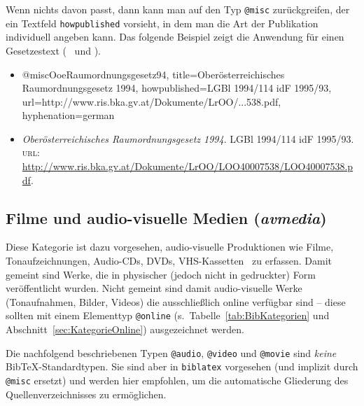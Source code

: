 Wenn nichts davon passt, dann kann man auf den Typ \texttt{@misc} zurückgreifen, der ein
Textfeld \texttt{howpublished} vorsieht, in dem man die Art der Publikation individuell 
angeben kann. Das folgende Beispiel zeigt die Anwendung für einen Gesetzestext 
(\sa\ \cite{FhStG93} und \cite{EuRichtlinie2000}).
%
\begin{itemize}
\item[]
\begin{GenericCode}[numbers=none]
@misc{OoeRaumordnungsgesetz94,
	title={Oberösterreichisches Raumordnungsgesetz 1994},
	howpublished={LGBl 1994/114 idF 1995/93},
	url={http://www.ris.bka.gv.at/Dokumente/LrOO/...538.pdf},
	hyphenation={german}
}
\end{GenericCode}
\item[\cite{OoeRaumordnungsgesetz94}]
\textit{Oberösterreichisches Raumordnungsgesetz 1994}. LGBl 1994/114 idF
1995/93. \textsc{url}: \url{http://www.ris.bka.gv.at/Dokumente/LrOO/LOO40007538/LOO40007538.pdf}.
\end{itemize}
%



\subsection{Filme und audio-visuelle Medien (\emph{avmedia})}
\label{sec:KategorieAvmedia}

Diese Kategorie ist dazu vorgesehen, audio-visuelle Produktionen wie Filme, 
Tonaufzeichnungen, Audio-CDs, DVDs, VHS-Kassetten \usw\ zu erfassen.
Damit gemeint sind Werke, die in physischer (jedoch nicht in gedruckter) Form
veröffentlicht wurden.
Nicht gemeint sind damit audio-visuelle Werke (Tonaufnahmen, Bilder, Videos) 
die ausschließlich online verfügbar sind -- diese sollten mit einem Elementtyp 
\texttt{@online} (s.\ Tabelle~\ref{tab:BibKategorien} und Abschnitt~\ref{sec:KategorieOnline}) ausgezeichnet werden.

Die nachfolgend beschriebenen Typen \texttt{@audio}, \texttt{@video} und \texttt{@movie} 
sind \emph{keine} BibTeX-Standardtypen. Sie sind aber in \texttt{biblatex} vorgesehen
(und implizit durch \texttt{@misc} ersetzt) und werden hier empfohlen, um die automatische 
Gliederung des Quellenverzeichnisses zu ermöglichen.


